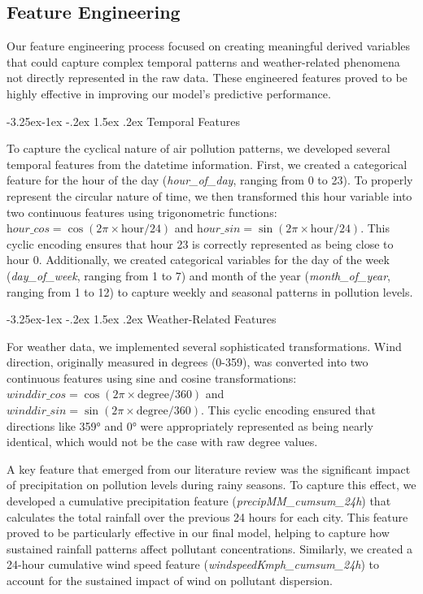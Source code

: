 \documentclass[twoside,11pt]{article}
\makeatletter
\renewcommand\subsubsection{\@startsection{subsubsection}{3}{\z@}%
  {-3.25ex\@plus -1ex \@minus -.2ex}%
  {1.5ex \@plus .2ex}%
  {\normalfont\bfseries\normalsize}}
\makeatother
\begin{document}
\subsection{Feature Engineering}

Our feature engineering process focused on creating meaningful derived variables that could capture complex temporal patterns and weather-related phenomena not directly represented in the raw data. These engineered features proved to be highly effective in improving our model's predictive performance.

\subsubsection{Temporal Features}

To capture the cyclical nature of air pollution patterns, we developed several temporal features from the datetime information. First, we created a categorical feature for the hour of the day (\textit{hour\_of\_day}, ranging from 0 to 23). To properly represent the circular nature of time, we then transformed this hour variable into two continuous features using trigonometric functions: $\textit{hour\_cos} = \cos(2\pi \times \text{hour}/24)$ and $\textit{hour\_sin} = \sin(2\pi \times \text{hour}/24)$. This cyclic encoding ensures that hour 23 is correctly represented as being close to hour 0. Additionally, we created categorical variables for the day of the week (\textit{day\_of\_week}, ranging from 1 to 7) and month of the year (\textit{month\_of\_year}, ranging from 1 to 12) to capture weekly and seasonal patterns in pollution levels.

\subsubsection{Weather-Related Features}

For weather data, we implemented several sophisticated transformations. Wind direction, originally measured in degrees (0-359), was converted into two continuous features using sine and cosine transformations: $\textit{winddir\_cos} = \cos(2\pi \times \text{degree}/360)$ and $\textit{winddir\_sin} = \sin(2\pi \times \text{degree}/360)$. This cyclic encoding ensured that directions like 359° and 0° were appropriately represented as being nearly identical, which would not be the case with raw degree values.

A key feature that emerged from our literature review was the significant impact of precipitation on pollution levels during rainy seasons. To capture this effect, we developed a cumulative precipitation feature (\textit{precipMM\_cumsum\_24h}) that calculates the total rainfall over the previous 24 hours for each city. This feature proved to be particularly effective in our final model, helping to capture how sustained rainfall patterns affect pollutant concentrations. Similarly, we created a 24-hour cumulative wind speed feature (\textit{windspeedKmph\_cumsum\_24h}) to account for the sustained impact of wind on pollutant dispersion.
\end{document}
